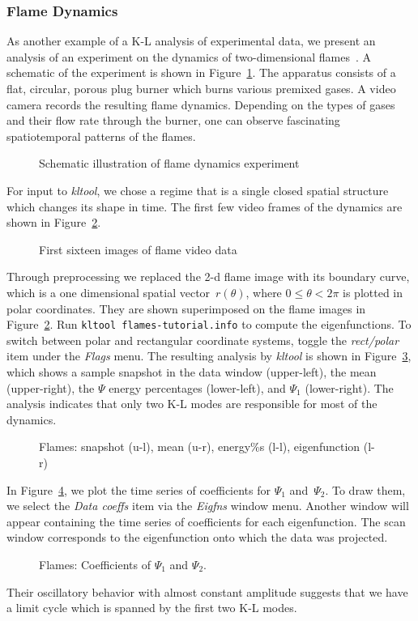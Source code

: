 \subsubsection{Flame Dynamics}
As another  example of a K-L analysis of experimental data, 
we present an analysis of 
an experiment on the dynamics of two-dimensional flames~\cite{gor}.
A schematic of the experiment is shown in Figure~\ref{fig:flames}.
The apparatus consists of a flat, circular, porous plug burner
which burns various premixed gases.  A video camera
records the resulting flame dynamics.  
Depending on the types of gases and
their flow rate through the burner,
one can observe fascinating spatiotemporal patterns of the flames.
\begin{figure}
\vspace*{10cm}
\caption{Schematic illustration of flame dynamics experiment}
\label{fig:flames}
\end{figure}
For input to {\sl kltool}, we chose a  regime
that is a single closed 
spatial structure
which changes its shape in time.  The first few video frames
of the dynamics are shown in Figure~\ref{fig:images}.
\begin{figure}
\vspace*{13cm}
\caption{First sixteen images of flame video data}
\label{fig:images}
\end{figure}
Through preprocessing
we replaced the 2-d flame image with its boundary curve,
which is a one dimensional spatial vector~$r(\theta)$, where
$0\leq\theta < 2\pi$ is plotted in polar coordinates. They are 
shown superimposed on the flame images in Figure~\ref{fig:images}.
Run {\tt kltool flames-tutorial.info} to compute the eigenfunctions. 
To switch between polar and rectangular coordinate systems, toggle the
{\sl rect/polar} item under the {\sl Flags} menu.
The resulting analysis by {\sl kltool} is shown in
Figure~\ref{fig:flamesnap}, which shows a sample snapshot
in the data window (upper-left), the
mean (upper-right), the $\Psi$ energy percentages (lower-left), and $\Psi_1$
(lower-right).  The analysis indicates that only two K-L modes are
responsible for most of the dynamics. 
\begin{figure}
\caption{Flames: snapshot (u-l), mean  (u-r), energy\%s (l-l),
	eigenfunction (l-r)}
\label{fig:flamesnap}
\end{figure} 
In Figure~\ref{fig:coeffs}, we plot the time series of
coefficients for $\Psi_1$ and~$\Psi_2$.  To draw them,
we select the {\sl Data coeffs}
item via the {\sl Eigfns} window menu.  Another window will appear containing
the time series of coefficients for each eigenfunction.  The scan window
corresponds to the eigenfunction onto which the data was projected.
\begin{figure}
\caption{Flames: Coefficients of $\Psi_1$ and $\Psi_2$.}
\label{fig:coeffs}
\end{figure}
Their oscillatory behavior with almost constant amplitude suggests
that we have a
limit cycle which is spanned by the first two K-L modes.
%

